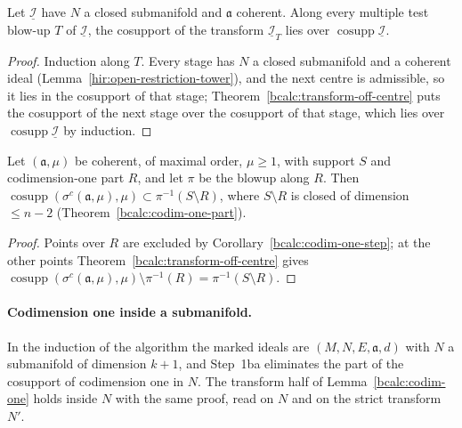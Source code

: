 \begin{corollary}
\label{bcalc:transform-off-centre-tower}
\leanok
Let \(\underline{\mathcal I}\) have \(N\) a closed submanifold and \(\mathfrak a\) coherent. Along every multiple test blow-up \(T\) of \(\underline{\mathcal I}\), the
cosupport of the transform \(\underline{\mathcal I}_T\) lies over \(\operatorname{cosupp}\underline{\mathcal I}\).
\end{corollary}
\begin{proof}
\leanok
Induction along \(T\). Every stage has \(N\) a closed submanifold and a coherent ideal (Lemma~\ref{hir:open-restriction-tower}), and the next centre is
admissible, so it lies in the cosupport of that stage; Theorem~\ref{bcalc:transform-off-centre} puts the cosupport of the next stage over the cosupport
of that stage, which lies over \(\operatorname{cosupp}\underline{\mathcal I}\) by induction.
\end{proof}

\begin{corollary}
\label{bcalc:codim-one-step-rest}
\upstreamleanok
Let \((\mathfrak a,\mu)\) be coherent, of maximal order, \(\mu\ge1\), with support \(S\) and codimension-one part \(R\), and let \(\pi\) be the blowup along
\(R\). Then \(\operatorname{cosupp}(\sigma^{c}(\mathfrak a,\mu),\mu)\subset\pi^{-1}(S\setminus R)\), where \(S\setminus R\) is closed of dimension \(\le n-2\)
(Theorem~\ref{bcalc:codim-one-part}).
\end{corollary}
\begin{proof}
\upstreamleanok
Points over \(R\) are excluded by Corollary~\ref{bcalc:codim-one-step}; at the other points Theorem~\ref{bcalc:transform-off-centre} gives
\(\operatorname{cosupp}(\sigma^{c}(\mathfrak a,\mu),\mu)\setminus\pi^{-1}(R)=\pi^{-1}(S\setminus R)\).
\end{proof}

\paragraph{Codimension one inside a submanifold.} In the induction of the algorithm the marked ideals are \((M,N,E,\mathfrak a,d)\) with \(N\) a
submanifold of dimension \(k+1\), and Step~1ba eliminates the part of the cosupport of codimension one in \(N\). The transform half of
Lemma~\ref{bcalc:codim-one} holds inside \(N\) with the same proof, read on \(N\) and on the strict transform \(N'\).

